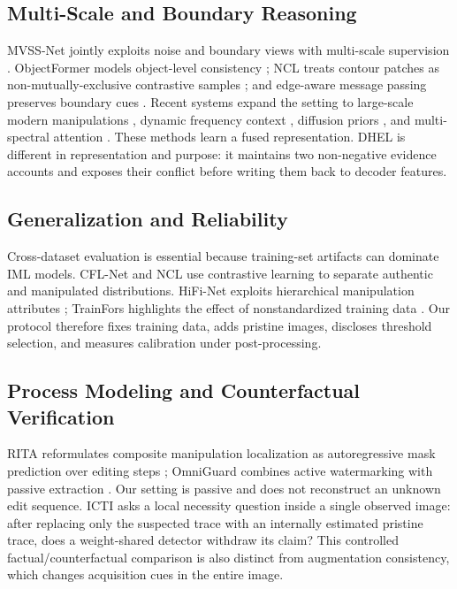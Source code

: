 \documentclass[journal]{IEEEtran}
\begin{document}
\subsection{Multi-Scale and Boundary Reasoning}
MVSS-Net jointly exploits noise and boundary views with multi-scale supervision
\cite{chen2021mvss}.  ObjectFormer models object-level consistency
\cite{wang2022objectformer}; NCL treats contour patches as non-mutually-exclusive
contrastive samples \cite{zhou2023ncl}; and edge-aware message passing preserves
boundary cues \cite{li2023edge}. Recent systems expand the setting to large-scale
modern manipulations \cite{qu2024modern}, dynamic frequency context
\cite{xiang2024scca}, diffusion priors \cite{yu2024diffforensics}, and multi-
spectral attention \cite{nam2025m2sformer}. These methods learn a fused
representation. DHEL is different in representation and purpose: it maintains
two non-negative evidence accounts and exposes their conflict before writing them
back to decoder features.

\subsection{Generalization and Reliability}
Cross-dataset evaluation is essential because training-set artifacts can dominate
IML models.  CFL-Net \cite{niloy2023cfl} and NCL \cite{zhou2023ncl} use contrastive
learning to separate authentic and manipulated distributions.  HiFi-Net exploits
hierarchical manipulation attributes \cite{guo2023hifi}; TrainFors highlights the
effect of nonstandardized training data \cite{nandi2023trainfors}.  Our protocol
therefore fixes training data, adds pristine images, discloses threshold selection,
and measures calibration under post-processing.

\subsection{Process Modeling and Counterfactual Verification}
RITA reformulates composite manipulation localization as autoregressive mask
prediction over editing steps \cite{zhu2026rita}; OmniGuard combines active
watermarking with passive extraction \cite{zhang2025omniguard}. Our setting is
passive and does not reconstruct an unknown edit sequence. ICTI asks a local
necessity question inside a single observed image: after replacing only the
suspected trace with an internally estimated pristine trace, does a weight-shared
detector withdraw its claim? This controlled factual/counterfactual comparison is
also distinct from augmentation consistency, which changes acquisition cues in
the entire image.
\end{document}

